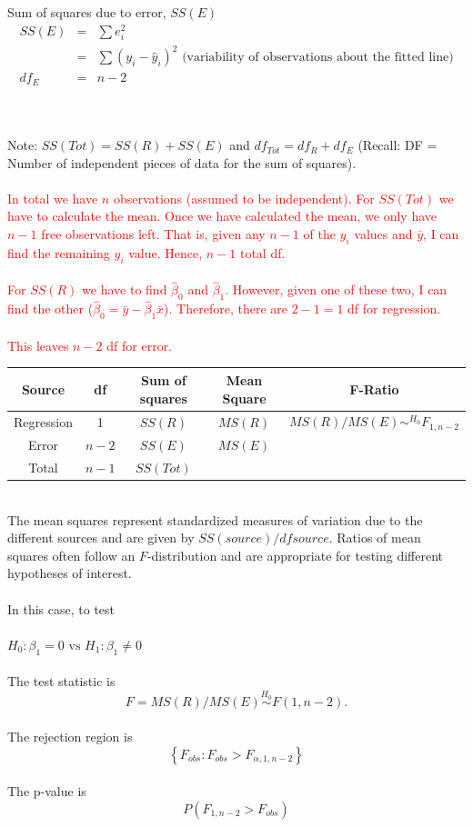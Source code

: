 Sum of squares due to error, $SS(E)$
\begin{eqnarray*}
SS(E) & = & \sum e_i^2 \\
& = & \sum (y_i - \hat{y}_i)^2 \text{    (variability of observations about the fitted line)}\\
df_E & = & n-2
\end{eqnarray*}

~\\~\\
Note: $SS(Tot)=SS(R)+SS(E)$ and $df_{Tot}=df_{R}+df_{E}$  (Recall: DF = Number of independent pieces of data for the sum of squares).\\~\\

\textcolor{red}{In total we have $n$ observations (assumed to be independent).  For $SS(Tot)$ we have to calculate the mean.  Once we have calculated the mean, we only have $n-1$ free observations left.  That is, given any $n-1$ of the $y_i$ values and $\bar{y}$, I can find the remaining $y_i$ value.  Hence, $n-1$ total df.  \\~\\
For $SS(R)$ we have to find $\hat\beta_0$ and $\hat\beta_1$.  However, given one of these two, I can find the other ($\hat{\beta}_0=\bar{y}-\hat{\beta}_1\bar{x}$).  Therefore, there are $2-1=1$ df for regression.\\~\\
This leaves $n-2$ df for error.}

\newpage

\begin{tabular}{|c|c|c|c|c|} \hline
Source &  df & Sum of squares &Mean Square & F-Ratio \\ \hline
Regression & 1& $SS(R)$  & $MS(R)$ & $MS(R)/MS(E)\sim^{H_0} F_{1,n-2}$ \\
Error & $n-2$ & $SS(E)$  & $MS(E)$ &  \\
Total & $n-1$ & $SS(Tot)$  & &  \\ \hline
\end{tabular}

~\\The mean squares represent standardized measures of variation due to the different sources and are given by $SS(source)/df source$.  Ratios of mean squares often follow an $F$-distribution and are appropriate for testing different hypotheses of interest.\\~\\
In this case, to test \\~\\
$ H_0: \beta_1 = 0 \mbox{  vs  } H_1:\beta_1 \neq 0$\\~\\
The test statistic is 
$$F = MS(R)/MS(E) \stackrel{H_0}{\sim} F(1,n-2).$$~\\
The rejection region is 
$$\left\{F_{obs}:F_{obs}>F_{\alpha,1,n-2}\right\}$$~\\
The p-value is
$$P(F_{1,n-2}>F_{obs})$$~\\

